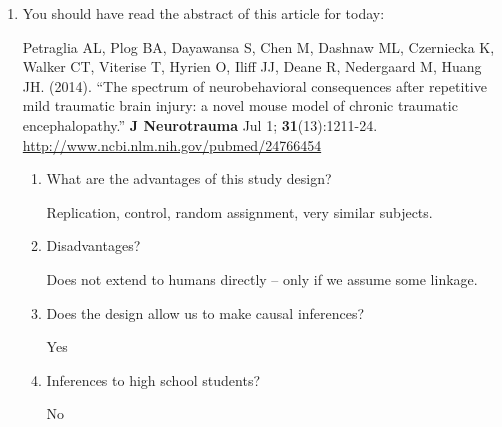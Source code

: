 \begin{enumerate}
\item You should have read the abstract of this article for today:

Petraglia AL, Plog BA, Dayawansa S, Chen M, Dashnaw ML, Czerniecka K,
Walker CT, Viterise T, Hyrien O, Iliff JJ, Deane R, Nedergaard M,
Huang JH. (2014). ``The spectrum of neurobehavioral consequences after repetitive mild traumatic brain injury: a novel mouse model of chronic traumatic encephalopathy.''
{\bf J Neurotrauma} Jul 1; {\bf 31}(13):1211-24. 
\url{http://www.ncbi.nlm.nih.gov/pubmed/24766454}

\begin{enumerate}
\item  What are the advantages of this study design?
\begin{students}
 \vfill
\end{students}

\begin{key}
  Replication, control, random assignment, very similar subjects.
\end{key}


\item Disadvantages?
\begin{students}
 \vfill
\end{students}

\begin{key}
 Does not extend to humans directly -- only if we assume some linkage.
\end{key}



\item Does the design allow us to make causal
    inferences?
\begin{students}
 \vspace{1cm}
\end{students}

\begin{key}
Yes
\end{key}

\item Inferences to high school students?

\begin{students}
\vspace*{.6cm}
\newpage
\end{students}

\begin{key}  No
\end{key}



\end{enumerate}


\end{enumerate}
